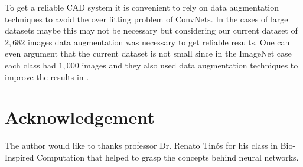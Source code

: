 \documentclass[twocolumn]{article}
\newcommand{\mycite}{\cite}
\begin{document}
To get a reliable CAD system it is convenient to rely on data augmentation techniques to avoid the over fitting problem of ConvNets. In the cases of large datasets maybe this may not be necessary but considering our current dataset of $2,682$ images data augmentation was necessary to get reliable results. One can even argument that the current dataset is not small since in the ImageNet case each class had $1,000$ images and they also used data augmentation techniques to improve the results in \mycite{ImageNet}.
\section*{Acknowledgement}
The author would like to thanks professor Dr. Renato Tinós for his class in Bio-Inspired Computation that helped to grasp the concepts behind neural networks.

\printbibliography
\end{document}
